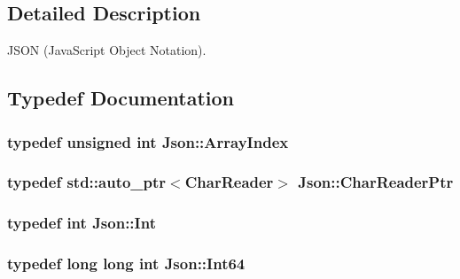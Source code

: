 \subsection{Detailed Description}
J\+S\+ON (Java\+Script Object Notation). 

\subsection{Typedef Documentation}
\subsubsection[{\texorpdfstring{Array\+Index}{ArrayIndex}}]{\setlength{\rightskip}{0pt plus 5cm}typedef unsigned int {\bf Json\+::\+Array\+Index}}\hypertarget{namespaceJson_a8048e741f2177c3b5d9ede4a5b8c53c2}{}\label{namespaceJson_a8048e741f2177c3b5d9ede4a5b8c53c2}
\subsubsection[{\texorpdfstring{Char\+Reader\+Ptr}{CharReaderPtr}}]{\setlength{\rightskip}{0pt plus 5cm}typedef std\+::auto\+\_\+ptr$<${\bf Char\+Reader}$>$ {\bf Json\+::\+Char\+Reader\+Ptr}}\hypertarget{namespaceJson_a4724efb8d41614b47036cb8b54233837}{}\label{namespaceJson_a4724efb8d41614b47036cb8b54233837}
\subsubsection[{\texorpdfstring{Int}{Int}}]{\setlength{\rightskip}{0pt plus 5cm}typedef int {\bf Json\+::\+Int}}\hypertarget{namespaceJson_a08122e8005b706d982e48cca1e2119c7}{}\label{namespaceJson_a08122e8005b706d982e48cca1e2119c7}
\subsubsection[{\texorpdfstring{Int64}{Int64}}]{\setlength{\rightskip}{0pt plus 5cm}typedef long long int {\bf Json\+::\+Int64}}\hypertarget{namespaceJson_ab7b47d2905da3b4ae60e4e800ec9ae5f}{}\label{namespaceJson_ab7b47d2905da3b4ae60e4e800ec9ae5f}
